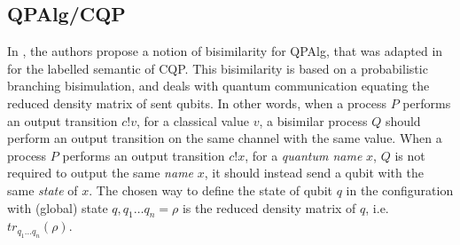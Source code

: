 \subsection{QPAlg/CQP}\label{lalire_bisimulation}

In \cite{lalireRelationsQuantumProcesses2006}, the authors propose a notion of bisimilarity for QPAlg, that was adapted in \cite{davidsonFormalVerificationTechniques2012} for the labelled semantic of CQP. This bisimilarity is based on a probabilistic branching bisimulation, and deals with quantum communication equating the reduced density matrix of sent qubits. In other words, when a process $P$ performs an output transition $c!v$, for a classical value $v$, a bisimilar process $Q$ should perform an output transition on the same channel with the same value. When a process $P$ performs an output transition $c!x$, for a \textit{quantum name} $x$, $Q$ is not required to output the same \textit{name} $x$, it should instead send a qubit with the same \textit{state} of $x$. The chosen way to define the state of qubit $q$ in the configuration with (global) state $q, q_1 \ldots q_n = \rho$ is the reduced density matrix of $q$, i.e. $tr_{q_1 \ldots q_n}(\rho)$.


